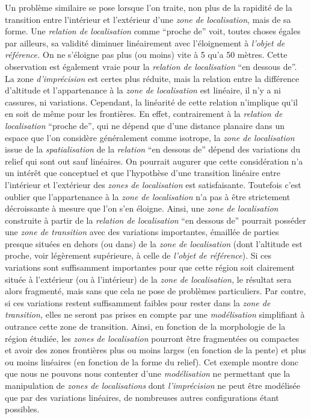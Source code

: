 Un problème similaire se pose lorsque l'on traite, non plus de la
rapidité de la transition entre l'intérieur et l'extérieur d'une
\emph{zone de localisation}, mais de sa forme. Une \emph{relation de
  localisation} comme \enquote{proche de} voit, toutes choses égales
par ailleurs, sa validité diminuer linéairement avec l'éloignement à
\emph{l'objet de référence.} On ne s'éloigne pas plus (ou moins) vite
à 5 qu'a 50 mètres. Cette observation est également vraie pour la
\emph{relation de localisation} \enquote{en dessous de}. La zone
\emph{d'imprécision} est certes plus réduite, mais la relation entre
la différence d'altitude et l'appartenance à la \emph{zone de
  localisation} est linéaire, il n'y a ni cassures, ni
variations. Cependant, la linéarité de cette relation n'implique qu'il
en soit de même pour les frontières. En effet, contrairement à la
\emph{relation de localisation} \enquote{proche de}, qui ne dépend que
d'une distance planaire dans un espace que l'on considère généralement
comme isotrope, la \emph{zone de localisation} issue de la
\emph{spatialisation} de la \emph{relation} \enquote{en dessous de}
dépend des variations du relief qui sont out sauf linéaires. On
pourrait augurer que cette considération n'a un intérêt que conceptuel
et que l'hypothèse d'une transition linéaire entre l'intérieur et
l'extérieur des \emph{zones de localisation} est
satisfaisante. Toutefois c'est oublier que l'appartenance à la
\emph{zone de localisation} n'a pas à être strictement décroissante à
mesure que l'on s'en éloigne. Ainsi, une \emph{zone de localisation}
construite à partir de la \emph{relation de localisation} \enquote{en
  dessous de} pourrait posséder une \emph{zone de transition} avec des
variations importantes, émaillée de parties presque situées en dehors
(ou dans) de la \emph{zone de localisation} (\ie dont l'altitude est
proche, voir légèrement supérieure, à celle de \emph{l'objet de
  référence}). Si ces variations sont suffisamment importantes pour
que cette région soit clairement située à l'extérieur (ou à
l'intérieur) de la \emph{zone de localisation,} le résultat sera alors
fragmenté, mais sans que cela ne pose de problèmes particuliers. Par
contre, si ces variations restent suffisamment faibles pour rester
dans la \emph{zone de transition,} elles ne seront pas prises en
compte par une \emph{modélisation} simplifiant à outrance cette zone
de transition. Ainsi, en fonction de la morphologie de la région
étudiée, les \emph{zones de localisation} pourront être fragmentées ou
compactes et avoir des zones frontières plus ou moins larges (en
fonction de la pente) et plus ou moins linéaires (en fonction de la
forme du relief). Cet exemple montre donc que nous ne pouvons nous
contenter d'une \emph{modélisation} ne permettant que la manipulation
de \emph{zones de localisations} dont \emph{l'imprécision} ne peut
être modélisée que par des variations linéaires, de nombreuses autres
configurations étant possibles.

